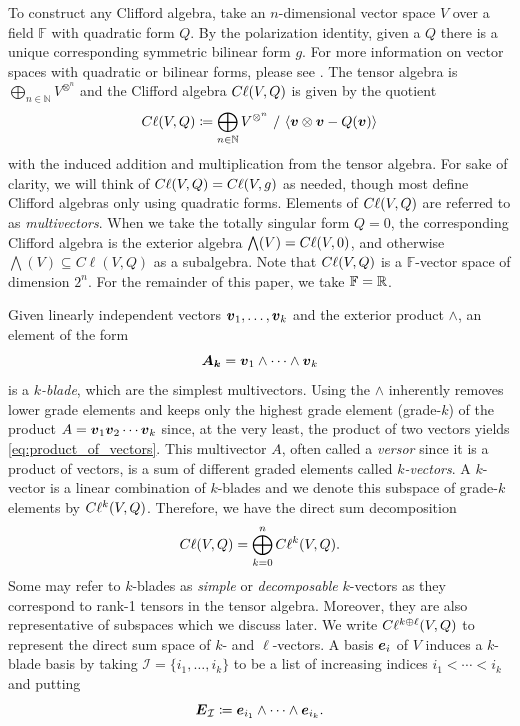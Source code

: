 \documentclass{article}
\begin{document}
To construct any Clifford algebra, take an $n$-dimensional vector space $V$ over a field $\mathbb{F}$ with quadratic form $Q$. By the polarization identity, given a $Q$ there is a unique corresponding symmetric bilinear form $g$. For more information on vector spaces with quadratic or bilinear forms, please see \cite{roman_metric_2008}. The tensor algebra is $\bigoplus_{n \in \mathbb{N}} V^{\otimes^n}$ and the Clifford algebra $C\ell(V,Q)$ is given by the quotient
\begin{equation}
\label{eq:ideal_quotient}
C\ell(V,Q) \coloneqq \bigoplus_{n \in \mathbb{N}} V^{\otimes^n} ~ / ~ \langle \boldsymbol{v} \otimes \boldsymbol{v} - Q(\boldsymbol{v}) \rangle
\end{equation}
with the induced addition and multiplication from the tensor algebra. For sake of clarity, we will think of $C\ell(V,Q)=C\ell(V,g)$ as needed, though most define Clifford algebras only using quadratic forms. Elements of $C\ell(V,Q)$ are referred to as \emph{multivectors}. When we take the totally singular form $Q=0$, the corresponding Clifford algebra is the exterior algebra $\bigwedge(V) = C\ell(V,0)$, and otherwise $\bigwedge(V)\subseteq C\ell(V,Q)$ as a subalgebra. Note that $C\ell(V,Q)$ is a $\mathbb{F}$-vector space of dimension $2^{n}$. For the remainder of this paper, we take $\mathbb{F}=\mathbb{R}$.

Given linearly independent vectors $\boldsymbol{v}_1,\dots,\boldsymbol{v}_k$ and the exterior product $\wedge$, an element of the form
\begin{equation}
    \boldsymbol{A_k} = \boldsymbol{v}_1 \wedge \cdots \wedge \boldsymbol{v}_k
\end{equation}
is a \emph{$k$-blade}, which are the simplest multivectors. Using the $\wedge$ inherently removes lower grade elements and keeps only the highest grade element (grade-$k$) of the product $A=\boldsymbol{v}_1\boldsymbol{v}_2\cdots \boldsymbol{v}_k$ since, at the very least, the product of two vectors yields \cref{eq:product_of_vectors}. This multivector $A$, often called a \emph{versor} since it is a product of vectors, is a sum of different graded elements called \emph{$k$-vectors}. A $k$-vector is a linear combination of $k$-blades and we denote this subspace of grade-$k$ elements by $C\ell^k(V,Q)$. Therefore, we have the direct sum decomposition
\begin{equation}
    \label{eq:grade_decomposition}
    C\ell(V,Q)= \bigoplus_{k=0}^n C\ell^k(V,Q).
\end{equation}
Some may refer to $k$-blades as \emph{simple} or \emph{decomposable} $k$-vectors as they correspond to rank-1 tensors in the tensor algebra. Moreover, they are also representative of subspaces which we discuss later. We write $C\ell^{k\oplus \ell}(V,Q)$ to represent the direct sum space of $k$- and $\ell$-vectors. A basis $\boldsymbol{e}_i$ of $V$ induces a $k$-blade basis by taking $\mathcal{I}=\{i_1,\dots,i_k\}$ to be a list of increasing indices $i_1 < \cdots < i_k$ and putting
\begin{equation}
\label{eq:basis_blades}
\boldsymbol{E}_\mathcal{I} \coloneqq \boldsymbol{e}_{i_1}\wedge \cdots \wedge \boldsymbol{e}_{i_k}.
\end{equation}
\end{document}
